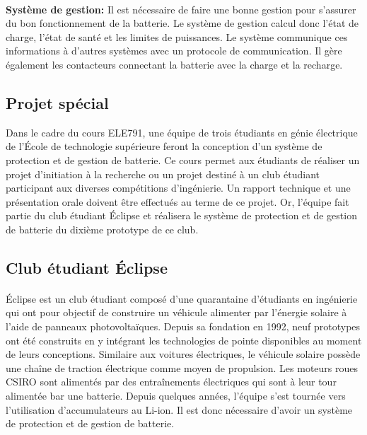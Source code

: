 		
		\paragraph{}
		\textbf{Système de gestion:} Il est nécessaire de faire une bonne gestion pour s'assurer du bon fonctionnement de la batterie. Le système de gestion calcul donc l'état de charge, l'état de santé et les limites de puissances. Le système communique ces informations à d'autres systèmes avec un protocole de communication. Il gère également les contacteurs connectant la batterie avec la charge et la recharge.
		
		
		\subsection{Projet spécial}
		Dans le cadre du cours ELE791, une équipe de trois étudiants en génie électrique de l'École de technologie supérieure feront la conception d'un système de protection et de gestion de batterie. Ce cours permet aux étudiants de réaliser un projet d'initiation à la recherche ou un projet destiné à un club étudiant participant aux diverses compétitions d'ingénierie. Un rapport technique et une présentation orale doivent être effectués au terme de ce projet. Or, l'équipe fait partie du club étudiant Éclipse et réalisera le système de protection et de gestion de batterie du dixième prototype de ce club.
		
		
		\subsection{Club étudiant Éclipse}
		
		\paragraph{}
		Éclipse est un club étudiant composé d'une quarantaine d'étudiants en ingénierie qui ont pour objectif de construire un véhicule alimenter par l'énergie solaire à l'aide de panneaux photovoltaïques. Depuis sa fondation en 1992, neuf prototypes ont été construits en y intégrant les technologies de pointe disponibles au moment de leurs conceptions. Similaire aux voitures électriques, le véhicule solaire possède une chaîne de traction électrique comme moyen de propulsion. Les moteurs roues  CSIRO sont alimentés par des entraînements électriques qui sont à leur tour alimentée bar une batterie. Depuis quelques années, l'équipe s'est tournée vers l'utilisation d'accumulateurs au Li-ion. Il est donc nécessaire d'avoir un système de protection et de gestion de batterie.
		
